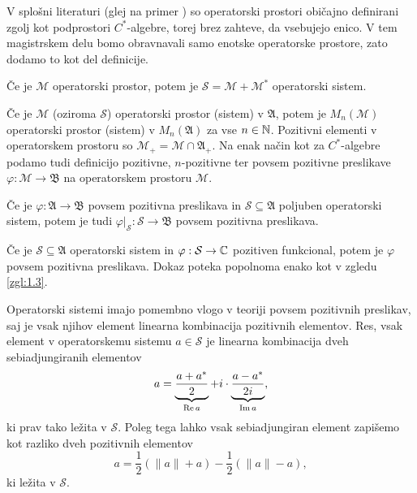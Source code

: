 \begin{opomba}
    V splošni literaturi (glej na primer \cite{paulsen2002}) so operatorski prostori običajno definirani zgolj kot podprostori $C^*$-algebre,
    torej brez zahteve, da vsebujejo enico. V tem magistrskem delu bomo obravnavali samo enotske operatorske prostore,
    zato dodamo to kot del definicije.
\end{opomba}

\begin{zgled}
    Če je $\mathcal{M}$ operatorski prostor, potem je $\mathcal{S} = \mathcal{M} + \mathcal{M}^*$ operatorski sistem.
\end{zgled}

Če je $\mathcal{M}$ (oziroma $\mathcal{S}$) operatorski prostor (sistem) v $\mathfrak{A}$,
potem je $M_n (\mathcal{M})$ operatorski prostor (sistem) v $M_n (\mathfrak{A})$ za vse $n \in \mathbb N$.
Pozitivni elementi v operatorskem prostoru so $\mathcal{M}_+ = \mathcal{M} \cap \mathfrak{A}_+$.
Na enak način kot za $C^*$-algebre podamo tudi definicijo pozitivne, $n$-pozitivne ter povsem pozitivne preslikave
$\varphi: \mathcal{M} \to \mathfrak{B}$ na operatorskem prostoru $\mathcal{M}$.

\begin{zgled}
    Če je $\varphi: \mathfrak{A} \to \mathfrak{B}$ povsem pozitivna preslikava
    in $\mathcal{S} \subseteq \mathfrak{A}$ poljuben operatorski sistem,
    potem je tudi $\varphi|_\mathcal{S}: \mathcal{S} \to \mathfrak{B}$ povsem pozitivna preslikava.
\end{zgled}

\begin{zgled}
    Če je $\mathcal{S} \subseteq \mathfrak{A}$ operatorski sistem in $\varphi: \mathcal{S} \to \mathbb C$
    pozitiven funkcional, potem je $\varphi$ povsem pozitivna preslikava. Dokaz poteka popolnoma enako kot v zgledu
    \ref{zgl:1.3}.
\end{zgled}

Operatorski sistemi imajo pomembno vlogo v teoriji povsem pozitivnih preslikav, saj je vsak njihov
element linearna kombinacija pozitivnih elementov.
Res, vsak element v operatorskemu sistemu $a \in \mathcal{S}$ je linearna kombinacija dveh sebiadjungiranih elementov 
$$a = \underbrace{\frac{a + a^*}{2}}_{\operatorname{Re} a} + i \cdot \underbrace{\frac{a - a^*}{2i}}_{\operatorname{Im} a},$$
ki prav tako ležita v $\mathcal{S}$.
Poleg tega lahko vsak sebiadjungiran element zapišemo kot razliko dveh pozitivnih elementov 
$$a = \frac{1}{2} (\| a\| + a) - \frac{1}{2} (\| a\| - a),$$
ki ležita v $\mathcal{S}$. 

